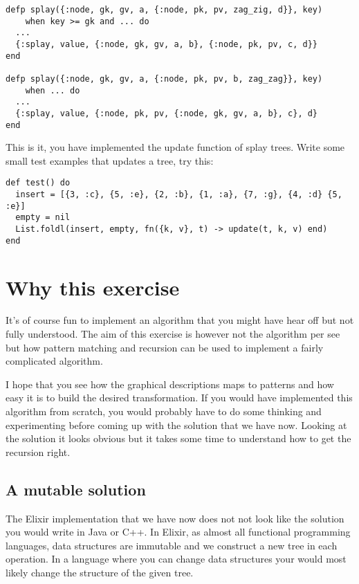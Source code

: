 \documentclass[a4paper,11pt]{article}
\begin{document}
\begin{verbatim}
defp splay({:node, gk, gv, a, {:node, pk, pv, zag_zig, d}}, key)
    when key >= gk and ... do
  ...
  {:splay, value, {:node, gk, gv, a, b}, {:node, pk, pv, c, d}}
end

defp splay({:node, gk, gv, a, {:node, pk, pv, b, zag_zag}}, key)
    when ... do
  ...
  {:splay, value, {:node, pk, pv, {:node, gk, gv, a, b}, c}, d}
end
\end{verbatim}

This is it, you have implemented the update function of splay
trees. Write some small test examples that updates a tree, try this:

\begin{verbatim}
def test() do
  insert = [{3, :c}, {5, :e}, {2, :b}, {1, :a}, {7, :g}, {4, :d} {5, :e}]
  empty = nil
  List.foldl(insert, empty, fn({k, v}, t) -> update(t, k, v) end)
end
\end{verbatim}



\section{Why this exercise}

It's of course fun to implement an algorithm that you might have hear
off but not fully understood. The aim of this exercise is however not
the algorithm per see but how pattern matching and recursion can be
used to implement a fairly complicated algorithm.

I hope that you see how the graphical descriptions maps to patterns
and how easy it is to build the desired transformation. If you would
have implemented this algorithm from scratch, you would probably have
to do some thinking and experimenting before coming up with the
solution that we have now. Looking at the solution it looks obvious
but it takes some time to understand how to get the recursion right.

\subsection{A mutable solution}
The Elixir implementation that we have now does not not look like the
solution you would write in Java or C++. In Elixir, as almost all
functional programming languages, data structures are immutable and we
construct a new tree in each operation. In a language where you can
change data structures your would most likely change the structure of
the given tree.
\end{document}
